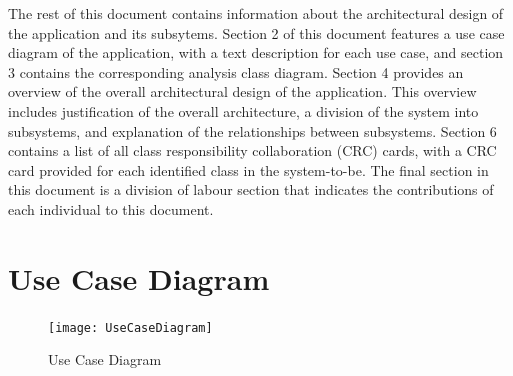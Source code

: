 \documentclass[]{article}
\begin{document}
The rest of this document contains information about the architectural design of the application and its subsytems. Section 2 of this document features a use case diagram of the application, with a text description for each use case, and section 3 contains the corresponding analysis class diagram. Section 4 provides an overview of the overall architectural design of the application. This overview includes justification of the overall architecture, a division of the system into subsystems, and explanation of the relationships between subsystems. Section 6 contains a list of all class responsibility collaboration (CRC) cards, with a CRC card provided for each identified class in the system-to-be. The final section in this document is a division of labour section that indicates the contributions of each individual to this document.



\section{Use Case Diagram}
\label{sec:use_case_diagram}
\begin{figure}[H]
	\centering
	\texttt{[image: UseCaseDiagram]}
	\caption{Use Case Diagram}
	\label{Use Case Diagram}
\end{figure}
\end{document}
